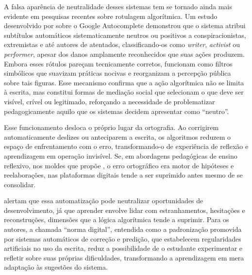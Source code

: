 \documentclass[portuguese]{textolivre}
\begin{document}
A falsa aparência de neutralidade desses sistemas tem se tornado ainda mais evidente em pesquisas recentes sobre rotulagem algorítmica. Um estudo desenvolvido por \textcite{alrawi2022autocomplete} sobre o Google Autocomplete demonstrou que o sistema atribui subtítulos automáticos sistematicamente neutros ou positivos a conspiracionistas, extremistas e até autores de atentados, classificando-os como \textit{writer}, \textit{activist} ou \textit{performer}, apesar dos danos amplamente reconhecidos que suas ações produzem. Embora esses rótulos pareçam tecnicamente corretos, funcionam como filtros simbólicos que suavizam práticas nocivas e reorganizam a percepção pública sobre tais figuras. Esse mecanismo confirma que a ação algorítmica não se limita à escrita, mas constitui formas de mediação social que selecionam o que deve ser visível, crível ou legitimado, reforçando a necessidade de problematizar pedagogicamente aquilo que os sistemas decidem apresentar como “neutro”.

Esse funcionamento desloca o próprio lugar da ortografia. Ao corrigirem automaticamente deslizes ou anteciparem a escrita, os algoritmos reduzem o espaço de enfrentamento com o erro, transformando-o de experiência de reflexão e aprendizagem em operação invisível. Se, em abordagens pedagógicas de ensino reflexivo, nos moldes que propõe \textcite{morais2002ortografia,morais2005aprendizado}, o erro ortográfico era motor de hipóteses e reelaborações, nas plataformas digitais tende a ser suprimido antes mesmo de se consolidar.

\textcite{fernandezjulia2024normadigital} alertam que essa automatização pode neutralizar oportunidades de desenvolvimento, já que aprender envolve lidar com estranhamentos, hesitações e reconstruções, dimensões que a lógica algorítmica tende a suprimir. Para os autores, a chamada “norma digital”, entendida como a padronização promovida por sistemas automáticos de correção e predição, que estabelecem regularidades artificiais no uso da escrita, reduz a possibilidade de o estudante experimentar e refletir sobre suas próprias dificuldades, transformando a aprendizagem em mera adaptação às sugestões do sistema.
\end{document}
